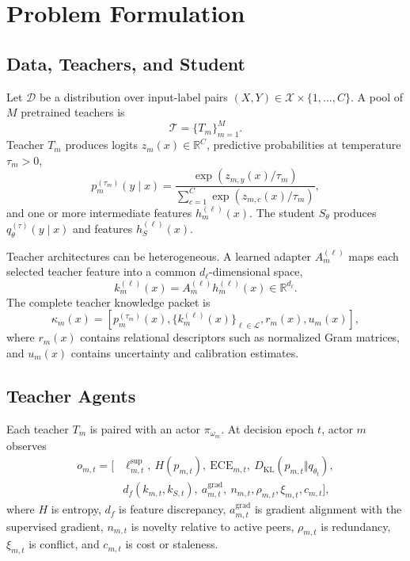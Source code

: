 \documentclass[10pt,twocolumn,a4paper]{article}
\newcommand{\R}{\mathbb{R}}
\newcommand{\KL}{D_{\mathrm{KL}}}
\newcommand{\cX}{\mathcal{X}}
\newcommand{\cT}{\mathcal{T}}
\newcommand{\cD}{\mathcal{D}}
\newcommand{\cL}{\mathcal{L}}
\begin{document}
\section{Problem Formulation}
\label{sec:problem}

\subsection{Data, Teachers, and Student}

Let \(\cD\) be a distribution over input-label pairs \((X,Y)\in\cX\times\{1,\ldots,C\}\). A pool of \(M\) pretrained teachers is
\begin{equation}
\cT=\{T_m\}_{m=1}^{M}.
\end{equation}
Teacher \(T_m\) produces logits \(z_m(x)\in\R^C\), predictive probabilities at temperature \(\tau_m>0\),
\begin{equation}
 p_m^{(\tau_m)}(y\mid x)
 =\frac{\exp(z_{m,y}(x)/\tau_m)}{\sum_{c=1}^{C}\exp(z_{m,c}(x)/\tau_m)},
\label{eq:teacherprob}
\end{equation}
and one or more intermediate features \(h_m^{(\ell)}(x)\). The student \(S_\theta\) produces \(q_\theta^{(\tau)}(y\mid x)\) and features \(h_S^{(\ell)}(x)\).

Teacher architectures can be heterogeneous. A learned adapter \(A_m^{(\ell)}\) maps each selected teacher feature into a common \(d_\ell\)-dimensional space,
\begin{equation}
 k_m^{(\ell)}(x)=A_m^{(\ell)}h_m^{(\ell)}(x)\in\R^{d_\ell}.
\label{eq:adapter}
\end{equation}
The complete teacher knowledge packet is
\begin{equation}
 \kappa_m(x)=\left[p_m^{(\tau_m)}(x),\{k_m^{(\ell)}(x)\}_{\ell\in\cL},r_m(x),u_m(x)\right],
\label{eq:packet}
\end{equation}
where \(r_m(x)\) contains relational descriptors such as normalized Gram matrices, and \(u_m(x)\) contains uncertainty and calibration estimates.

\subsection{Teacher Agents}

Each teacher \(T_m\) is paired with an actor \(\pi_{\omega_m}\). At decision epoch \(t\), actor \(m\) observes
\begin{align}
 o_{m,t}=[&\ell_{m,t}^{\mathrm{sup}},\ H(p_{m,t}),\ \mathrm{ECE}_{m,t},\
 \KL(p_{m,t}\Vert q_{\theta_t}),\nonumber\\
 &d_f(k_{m,t},k_{S,t}),\ a_{m,t}^{\mathrm{grad}},\ n_{m,t},\rho_{m,t},\xi_{m,t},c_{m,t}],
\label{eq:observation}
\end{align}
where \(H\) is entropy, \(d_f\) is feature discrepancy, \(a_{m,t}^{\mathrm{grad}}\) is gradient alignment with the supervised gradient, \(n_{m,t}\) is novelty relative to active peers, \(\rho_{m,t}\) is redundancy, \(\xi_{m,t}\) is conflict, and \(c_{m,t}\) is cost or staleness.
\end{document}
